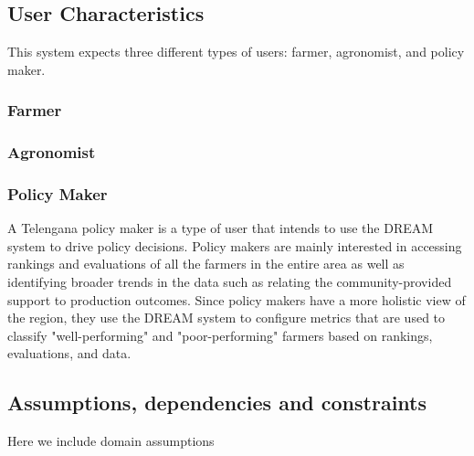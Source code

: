 \subsection{User Characteristics}
\begin{flushleft}
This system expects three different types of users: farmer, agronomist, and policy maker.
\subsubsection{Farmer}
\subsubsection{Agronomist}
\subsubsection{Policy Maker}
A Telengana policy maker is a type of user that intends to use the DREAM system to drive policy decisions. Policy makers are mainly interested in accessing rankings and evaluations of all the farmers in the entire area as well as identifying broader trends in the data such as relating the community-provided support to production outcomes. Since policy makers have a more holistic view of the region, they use the DREAM system to configure metrics that are used to classify "well-performing" and "poor-performing" farmers based on rankings, evaluations, and data.\\
%



\end{flushleft}


\subsection{Assumptions, dependencies and constraints}
Here we include domain assumptions





